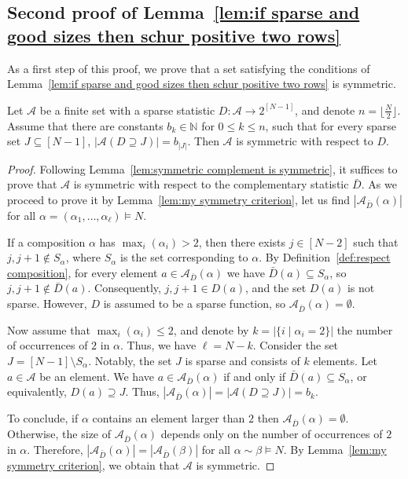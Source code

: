 \documentclass[ALCO]{cedram}
\newcommand{\NN}{\mathbb{N}}
\newcommand{\A}{\mathcal{A}}
\begin{document}
\subsection{Second proof of Lemma~\ref{lem:if sparse and good sizes then schur positive two rows}}
\label{subsec:proof if sparse and good sizes then schur positive two rows by superstandard}
As a first step of this proof, we prove that a set satisfying the conditions of Lemma~\ref{lem:if sparse and good sizes then schur positive two rows} is symmetric.
\begin{lemma}
\label{lem:sufficent condition symmetry two rows}
    Let $\A$ be a finite set with a sparse statistic $D:\A \to 2^{[N-1]}$, and denote $n = \lfloor\frac{N}{2} \rfloor$. Assume that there are constants $b_k \in \NN$ for $0 \le k \le n$, such that for every sparse set $J \subseteq [N-1]$, $|\A(D \supseteq J)| = b_{|J|}$.
    Then $\A$ is symmetric with respect to $D$.
\end{lemma}
\begin{proof}
    Following Lemma~\ref{lem:symmetric complement is symmetric}, it suffices to prove that $\A$ is symmetric with respect to the complementary statistic $\bar{D}$. As we proceed to prove it by Lemma~\ref{lem:my symmetry criterion}, let us find $|\A_{\bar{D}}(\alpha)|$ for all $\alpha = (\alpha_1, \dots, \alpha_\ell) \vDash N$.
    
    If a composition $\alpha$ has $\max_i (\alpha_i) > 2$, 
    then there exists $j \in [N-2]$ such that $j,j+1 \notin S_\alpha$, where $S_\alpha$ is the set corresponding to $\alpha$. By Definition~\ref{def:respect composition}, for every element $a \in \A_{\bar{D}}(\alpha)$ we have $\bar{D}(a) \subseteq S_\alpha$, so $j, j + 1 \notin \bar{D}(a)$. Consequently, $j,j+1 \in D(a)$, and the set $D(a)$ is not sparse. However,
    $D$ is assumed to be a sparse function, so $\A_{\bar{D}}(\alpha) = \emptyset$.
    
    Now assume that $\max_i (\alpha_i) \le 2$, and denote by $k = |\{i \mid \alpha_i = 2\}|$ the number of occurrences of $2$ in $\alpha$. Thus, we have $\ell = N - k$.
    Consider the set $J = [N-1] \setminus S_\alpha$. Notably, the set $J$ is sparse and consists of $k$ elements.
    Let $a \in \A$ be an element. We have $a \in \A_{\bar{D}}(\alpha)$ if and only if $\bar{D}(a) \subseteq S_\alpha$, or equivalently, $D(a) \supseteq J$. Thus, $|\A_{\bar{D}}(\alpha)| = |\A(D \supseteq J)| = b_k$.
    
    To conclude, if $\alpha$ contains an element larger than $2$ then $\A_{\bar{D}}(\alpha) = \emptyset$. Otherwise, the size of $\A_{\bar{D}}(\alpha)$ depends only on the number of occurrences of $2$ in $\alpha$. Therefore, $|\A_{\bar{D}}(\alpha)| = |\A_{\bar{D}}(\beta)|$ for all $\alpha \sim \beta \vDash N$. By Lemma~\ref{lem:my symmetry criterion}, we obtain that $\A$ is symmetric.
\end{proof}
\end{document}
